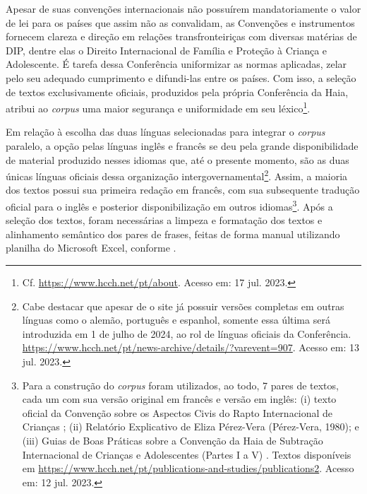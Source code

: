 \documentclass[portuguese]{textolivre}
\begin{document}
Apesar de suas convenções internacionais não possuírem mandatoriamente o valor de lei para os países que assim não as convalidam, as Convenções e instrumentos fornecem clareza e direção em relações transfronteiriças com diversas matérias de DIP, dentre elas o Direito Internacional de Família e Proteção à Criança e Adolescente. É tarefa dessa Conferência uniformizar as normas aplicadas, zelar pelo seu adequado cumprimento e difundi-las entre os países. Com isso, a seleção de textos exclusivamente oficiais, produzidos pela própria Conferência da Haia, atribui ao \textit{corpus} uma maior segurança e uniformidade em seu léxico\footnote{Cf. \url{https://www.hcch.net/pt/about}. Acesso em: 17 jul. 2023.}.
 
Em relação à escolha das duas línguas selecionadas para integrar o \textit{corpus} paralelo, a opção pelas línguas inglês e francês se deu pela grande disponibilidade de material produzido nesses idiomas que, até o presente momento, são as duas únicas línguas oficiais dessa organização intergovernamental\footnote{Cabe destacar que apesar de o site já possuir versões completas em outras línguas como o alemão, português e espanhol, somente essa última será introduzida em 1 de julho de 2024, ao rol de línguas oficiais da Conferência. \url{https://www.hcch.net/pt/news-archive/details/?varevent=907}. Acesso em: 13 jul. 2023.}. Assim, a maioria dos textos possui sua primeira redação em francês, com sua subsequente tradução oficial para o inglês e posterior disponibilização em outros idiomas\footnote{Para a construção do \textit{corpus} foram utilizados, ao todo, 7 pares de textos, cada um com sua versão original em francês e versão em inglês: (i) texto oficial da Convenção sobre os Aspectos Civis do Rapto Internacional de Crianças \cite{hcch_convention_1980}; (ii) Relatório Explicativo de Eliza Pérez-Vera (Pérez-Vera, 1980); e (iii) Guias de Boas Práticas sobre a Convenção da Haia de Subtração Internacional de Crianças e Adolescentes (Partes I a V) \cite{hcch_guide_2003a,hcch_guide_2003b,hcch_guide_2005,hcch_guide_2010,hcch_guide_2012}. Textos disponíveis em \url{https://www.hcch.net/pt/publications-and-studies/publications2}. Acesso em: 12 jul. 2023.}. Após a seleção dos textos, foram necessárias a limpeza e formatação dos textos e alinhamento semântico dos pares de frases, feitas de forma manual utilizando planilha do Microsoft Excel, conforme .
\end{document}
